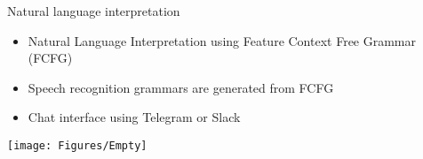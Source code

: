 \documentclass[12pt,a4paper]{article}
\newcommand{\emptylogo}{\texttt{[image: Figures/Empty]}}
\begin{document}
\begin{slidetop}
\begin{multicols}{2}
\vspace{-0.83cm} %

\begin{bclogo}[couleur = white, arrondi = 0.25, couleurBord = tuedarkblue, barre = none, logo=\emptylogo]{\textcolor{tuedarkblue}{Natural language interpretation}}
\medskip %
\begin{itemize}[itemsep = 0pt, parsep = 0pt, leftmargin=15pt]
	\item Natural Language Interpretation using Feature Context Free Grammar (FCFG)
	\item Speech recognition grammars are generated from FCFG
	\item Chat interface using Telegram or Slack
\end{itemize}
\end{bclogo}

\texttt{[image: Figures/Empty]}
\end{multicols}
\end{slidetop}
\end{document}
